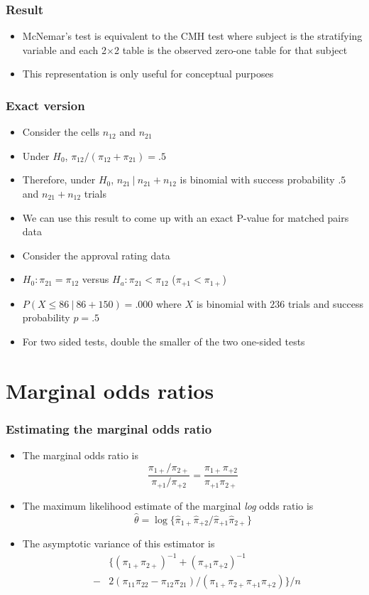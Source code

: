 \documentclass[aspectratio=169]{beamer}
\begin{document}
\begin{frame}\frametitle{Result}
\begin{itemize}
\item McNemar's test is equivalent to the CMH test where subject is
  the stratifying variable and each 2$\times$2 table is the observed
  zero-one table for that subject
\item This representation is only useful for conceptual purposes
\end{itemize}
\end{frame}


\begin{frame}\frametitle{Exact version}
\begin{itemize}
\item Consider the cells $n_{12}$ and $n_{21}$
\item Under $H_0$, $\pi_{12} / (\pi_{12} + \pi_{21}) = .5$
\item Therefore, under $H_0$, $n_{21} ~|~ n_{21} + n_{12}$ is binomial
  with success probability $.5$ and $n_{21} + n_{12}$ trials
\item We can use this result to come up with an exact P-value for
  matched pairs data
\end{itemize}
\end{frame}

\begin{frame}
\begin{itemize}
\item Consider the approval rating data
\item $H_0 : \pi_{21} = \pi_{12}$ versus $H_a : \pi_{21} < \pi_{12}$ ($\pi_{+1} < \pi_{1+}$)
\item $P(X \leq 86 ~|~ 86 + 150) = .000$ where $X$ is binomial with
  $236$ trials and success probability $p = .5$
\item For two sided tests, double the smaller of the two one-sided
  tests
\end{itemize}
\end{frame}


\section{Marginal odds ratios}
\begin{frame}\frametitle{Estimating the marginal odds ratio}
\begin{itemize}
\item The marginal odds ratio is
$$
\frac{\pi_{1+}/\pi_{2+}}{\pi_{+1}/\pi_{+2}}
  = \frac{\pi_{1+}\pi_{+2}}{\pi_{+1}\pi_{2+}}
$$
\item The maximum likelihood estimate of the marginal {\em log} odds ratio is
$$\hat \theta = \log\{\hat \pi_{1+} \hat \pi_{+2}/ \hat \pi_{+1} \hat \pi_{2+}\}$$
\item The asymptotic variance of this estimator is
  \begin{eqnarray*}
&   & \{ (\pi_{1+}\pi_{2+})^{-1} + (\pi_{+1}\pi_{+2})^{-1} \\
& - & 2(\pi_{11}\pi_{22} - \pi_{12}\pi_{21})/ (\pi_{1+}\pi_{2+}\pi_{+1}\pi_{+2})\}/n
  \end{eqnarray*}
\end{itemize}
\end{frame}
\end{document}
